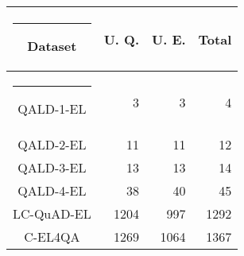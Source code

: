 \begin{table}[h!]
  \centering
  \begin{tabular}{|c|r|r|r|}
    \hline\rule{-2pt}{15pt}
    \textbf{Dataset} & \textbf{U. Q.} & \textbf{U. E.} & \textbf{Total} \\
    \hline\rule{-4pt}{10pt}
    QALD-1-EL & 3 & 3 & 4 \\ \hline
    QALD-2-EL & 11 & 11 & 12 \\ \hline
    QALD-3-EL & 13 & 13 & 14 \\ \hline
    QALD-4-EL & 38 & 40 & 45 \\ \hline
    LC-QuAD-EL & 1204 & 997 & 1292 \\ \hline
    C-EL4QA & 1269 & 1064 & 1367 \\ \hline
  \end{tabular}
\end{table}

